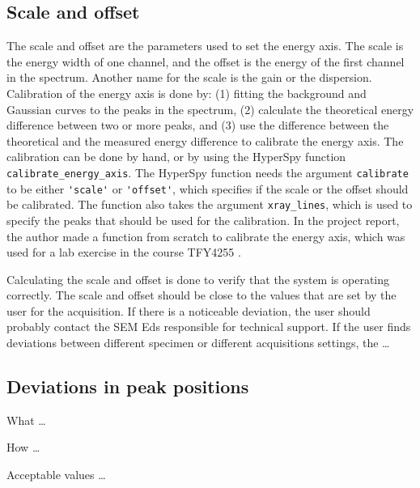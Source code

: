 \subsection{Scale and offset}
\label{theory:eds_performance:scaleoffset}



The scale and offset are the parameters used to set the energy axis.
The scale is the energy width of one channel, and the offset is the energy of the first channel in the spectrum.
Another name for the scale is the gain or the dispersion.
Calibration of the energy axis is done by: (1) fitting the background and Gaussian curves to the peaks in the spectrum, (2) calculate the theoretical energy difference between two or more peaks, and (3) use the difference between the theoretical and the measured energy difference to calibrate the energy axis.
The calibration can be done by hand, or by using the HyperSpy function \verb|calibrate_energy_axis|.
The HyperSpy function needs the argument \verb|calibrate| to be either \verb|'scale'| or \verb|'offset'|, which specifies if the scale or the offset should be calibrated.
The function also takes the argument \verb|xray_lines|, which is used to specify the peaks that should be used for the calibration.
In the project report, the author made a function from scratch to calibrate the energy axis, which was used for a lab exercise in the course TFY4255 \cite{project_report}.


Calculating the scale and offset is done to verify that the system is operating correctly.
The scale and offset should be close to the values that are set by the user for the acquisition.
If there is a noticeable deviation, the user should probably contact the SEM Eds responsible for technical support.
If the user finds deviations between different specimen or different acquisitions settings, the \dots






\subsection{Deviations in peak positions}
\label{theory:eds_performance:peakpositions}


What \dots


How \dots


Acceptable values \dots


